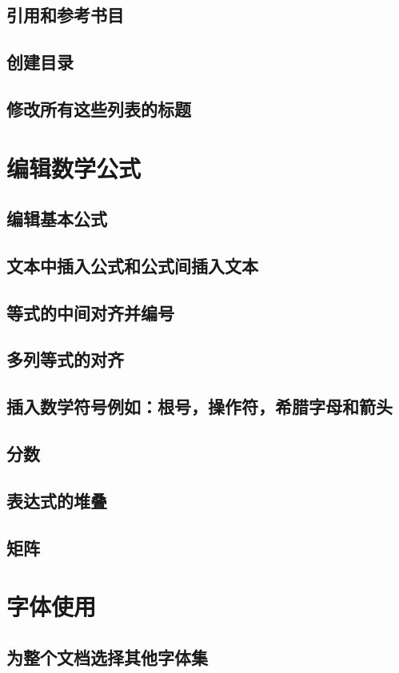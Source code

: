 \documentclass{book}
\begin{document}
	\section{引用和参考书目}
	\section{创建目录}
	\section{修改所有这些列表的标题}
\chapter{编辑数学公式}
	\section{编辑基本公式}
	\section{文本中插入公式和公式间插入文本}
	\section{等式的中间对齐并编号}
	\section{多列等式的对齐}
	\section{插入数学符号例如：根号，操作符，希腊字母和箭头}
	\section{分数}
	\section{表达式的堆叠}
	\section{矩阵}
\chapter{字体使用}
	\section{为整个文档选择其他字体集}
\end{document}
